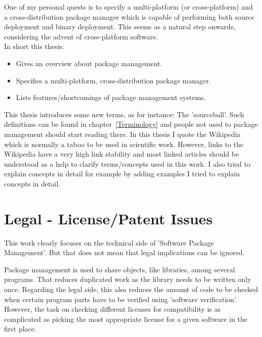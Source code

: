 \documentclass[a4paper,10pt]{article}
\begin{document}
One of my personal quests is to specify a multi-platform (or cross-platform) and a cross-distribution package manager which is capable of performing both source deployment and binary deployment. This seems as a natural step onwards, considering the advent of cross-platform software. \\

In short this thesis:
\begin{itemize}
\item Gives an overview about package management.
\item Specifies a multi-platform, cross-distribution package manager.
\item Lists features/shortcomings of package management systems.
\end{itemize}

This thesis introduces some new terms, as for instance: The 'sourceball'. Such definitions can be found in  \mbox{chapter \ref{Terminology}} and people not used to package management should start reading there. In this thesis I quote the Wikipedia which is normally a taboo to be used in scientific work. However, links to the Wikipedia have a very high link stability and most linked articles should be understood as a help to clarify terms/concepts used in this work. I also tried to explain concepts in detail for example by adding examples I tried to explain concepts in detail. 




\newpage
\section{Legal - License/Patent Issues}
\label{LicenseIssues}
This work clearly focuses on the technical side of 'Software Package Management'. But that does not mean that legal implications can be ignored.

Package management is used to share objects, like libraries, among several programs. That reduces duplicated work as the library needs to be written only once. Regarding the legal side, this also reduces the amount of code to be checked when certain program parts have to be verified using 'software verification'. However, the task on checking different licenses for compatibility is as complicated as picking the most appropriate license for a given software in the first place.
\end{document}
